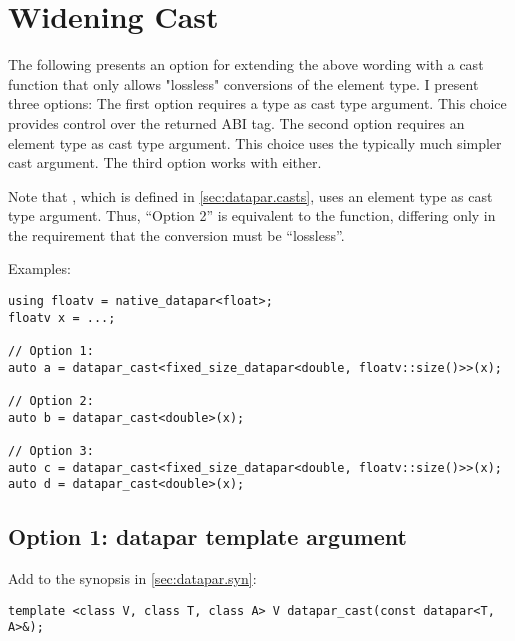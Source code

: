 \section{Widening Cast}\label{sec:widen}
The following presents an option for extending the above wording with a cast function that only allows "lossless" conversions of the element type.
I present three options:
The first option requires a \datapar type as cast type argument. This choice provides control over the returned ABI tag.
The second option requires an element type as cast type argument. This choice uses the typically much simpler cast argument.
The third option works with either.

Note that , which is defined in \ref{sec:datapar.casts}, uses an element type as cast type argument.
Thus, “Option 2” is equivalent to the  function, differing only in the requirement that the conversion must be “lossless”.

Examples:
\begin{lstlisting}[style=Vc]
using floatv = native_datapar<float>;
floatv x = ...;

// Option 1:
auto a = datapar_cast<fixed_size_datapar<double, floatv::size()>>(x);

// Option 2:
auto b = datapar_cast<double>(x);

// Option 3:
auto c = datapar_cast<fixed_size_datapar<double, floatv::size()>>(x);
auto d = datapar_cast<double>(x);
\end{lstlisting}

\subsection{Option 1: datapar template argument}

Add to the synopsis in \ref{sec:datapar.syn}:
\begin{wgText}
  \begin{lstlisting}[style=Vc]
    template <class V, class T, class A> V datapar_cast(const datapar<T, A>&);
  \end{lstlisting}
\end{wgText}

